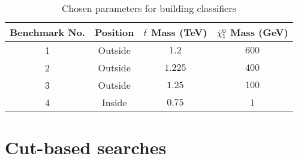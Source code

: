 \begin{table}[htbp]
    \centering
    \begin{tabular}{c|c|c|c} 
    \toprule
    Benchmark No. & Position & $\Tilde{t}$ Mass (TeV) & $\Tilde{\chi}_1^0$ Mass (GeV) \\
    \midrule
    \rowcolor{gray!6} 1 & Outside & $ 1.2 $ & $ 600 $ \\
    2 & Outside & $ 1.225 $ & $ 400 $ \\
    \rowcolor{gray!6} 3 & Outside & $ 1.25 $ & $ 100 $ \\
    4 & Inside & $ 0.75 $ & $ 1 $\\
    \bottomrule
    \end{tabular}
    \caption{Chosen parameters for building classifiers} 
    \label{tab:benchmarks}
\end{table}

\section{Cut-based searches}